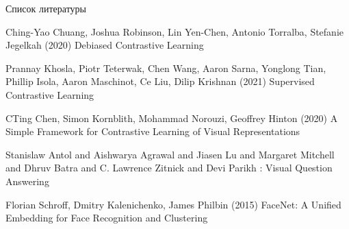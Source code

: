 \documentclass{beamer}
\begin{document}
\begin{frame}{Список литературы}
\begin{thebibliography}{99} 
    \footnotesize
    
        Ching-Yao Chuang, Joshua Robinson, Lin Yen-Chen, Antonio Torralba, Stefanie Jegelkah (2020)
        \newblock Debiased Contrastive Learning

        Prannay Khosla, Piotr Teterwak, Chen Wang, Aaron Sarna, Yonglong Tian, Phillip Isola, Aaron Maschinot, Ce Liu, Dilip Krishnan (2021)
        \newblock Supervised Contrastive Learning

        CTing Chen, Simon Kornblith, Mohammad Norouzi, Geoffrey Hinton (2020)
        \newblock A Simple Framework for Contrastive Learning of Visual Representations

        Stanislaw Antol and Aishwarya Agrawal and Jiasen Lu and Margaret Mitchell and Dhruv Batra and C. Lawrence Zitnick and Devi Parikh
        : {V}isual {Q}uestion {A}nswering

        Florian Schroff, Dmitry Kalenichenko, James Philbin (2015)
        \newblock FaceNet: A Unified Embedding for Face Recognition and Clustering

\end{thebibliography}
\end{frame}
\end{document}
